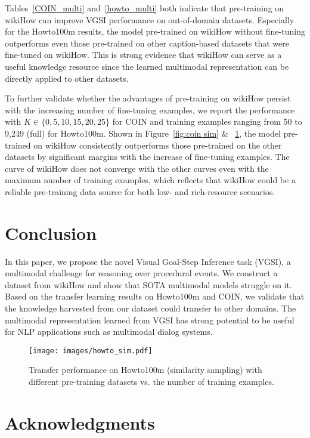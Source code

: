 \documentclass[11pt]{article}
\begin{document}
Tables~\ref{COIN_multi} and~\ref{howto_multi} both indicate that pre-training on wikiHow can improve VGSI performance on out-of-domain datasets. Especially for the Howto100m results, the model pre-trained on wikiHow without fine-tuning outperforms even those pre-trained on other caption-based datasets that were fine-tuned on wikiHow. This is strong evidence that wikiHow can serve as a useful knowledge resource since the learned multimodal representation can be directly applied to other datasets. 

To further validate whether the advantages of pre-training on wikiHow persist with the increasing number of fine-tuning examples, we report the performance with $K \in \{0, 5, 10, 15, 20, 25\}$ for COIN and training examples ranging from 50 to 9,249 (full) for Howto100m. Shown in Figure~\ref{fig:coin sim} \& ~\ref{fig:howto random}, the model pre-trained on wikiHow consistently outperforms those pre-trained on the other datasets by significant margins with the increase of fine-tuning examples. The curve of wikiHow does not converge with the other curves even with the maximum number of training examples, which reflects that wikiHow could be a reliable pre-training data source for both low- and rich-resource scenarios. 

\section{Conclusion}
In this paper, we propose the novel Visual Goal-Step Inference task (VGSI), a multimodal challenge for reasoning over procedural events. We construct a dataset from wikiHow and show that SOTA multimodal models struggle on it. Based on the transfer learning results on Howto100m and COIN, we validate that the knowledge harvested from our dataset could transfer to other domains. The multimodal representation learned from VGSI has strong potential to be useful for NLP applications such as multimodal dialog systems.

\begin{figure}[!t]
    \texttt{[image: images/howto\_sim.pdf]}
    \caption{Transfer performance on Howto100m (similarity sampling) with different pre-training datasets vs. the number of training examples.}
    \label{fig:howto random}
    \vspace{-0.1in}
\end{figure}

\vspace{-0.1in}
\section*{Acknowledgments}
\vspace{-0.05in}
\end{document}
